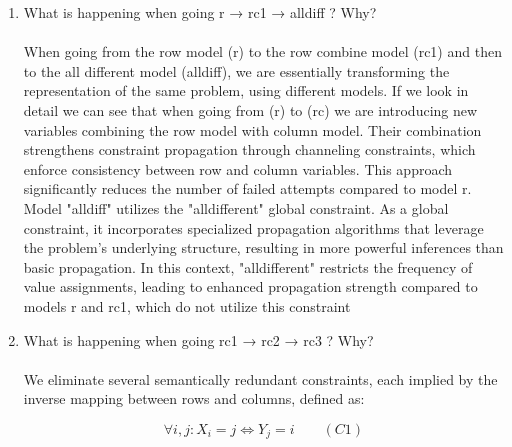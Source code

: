 \documentclass{article}
\begin{document}
\begin{enumerate}
  \item What is happening when going r → rc1 → alldiff ? Why? \\ \\
  When going from the row model (r) to the row combine model (rc1) and then to the all different model (alldiff), we are essentially transforming the representation of the same problem, using different models. If we look in detail we can see that when going from (r) to (rc) we are introducing new variables combining the row model with column model. Their combination strengthens constraint propagation through channeling constraints, which enforce consistency between row and column variables. This approach significantly reduces the number of failed attempts compared to model r.
  Model "alldiff" utilizes the "alldifferent" global constraint. As a global constraint, it incorporates specialized propagation algorithms that leverage the problem's underlying structure, resulting in more powerful inferences than basic propagation. In this context, "alldifferent" restricts the frequency of value assignments, leading to enhanced propagation strength compared to models r and rc1, which do not utilize this constraint





  
  \item What is happening when going rc1 → rc2 → rc3 ? Why? \\ \\
      We eliminate several semantically redundant constraints, each implied by the inverse mapping between rows and columns, defined as:

    $$\forall i, j: X_i = j \iff Y_j = i  \quad\quad (C1) $$


\end{enumerate}
\end{document}
